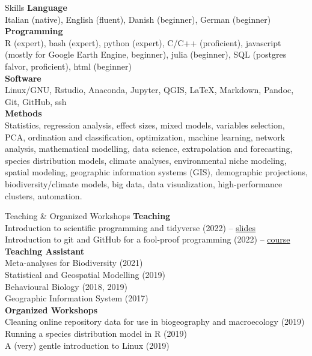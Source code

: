 \documentclass{resume} %
\begin{document}
\begin{rSection}{Skills}
{\bf Language}\\
Italian (native), English (fluent), Danish (beginner), German (beginner)\\
{\bf Programming}\\
R (expert), bash (expert), python (expert), C/C++ (proficient), javascript (mostly for Google Earth Engine, beginner), julia (beginner), SQL (postgres falvor, proficient), html (beginner)\\
{\bf Software} \\
Linux/GNU, Rstudio, Anaconda, Jupyter, QGIS, \LaTeX, Markdown, Pandoc, Git, GitHub, ssh\\
{\bf Methods} \\
Statistics, regression analysis, effect sizes, mixed models, variables selection, PCA, ordination and classification, optimization, machine learning, network analysis, mathematical modelling, data science, extrapolation and forecasting, species distribution models, climate analyses, environmental niche modeling, spatial modeling, geographic information systems (GIS), demographic projections, biodiversity/climate models, big data, data visualization, high-performance clusters, automation.
\end{rSection}

\begin{rSection}{Teaching \& Organized Workshops}
{\bf Teaching} \\
Introduction to scientific programming and tidyverse (2022) -- \href{https://emilio-berti.github.io/teaching/tidyverse.html#(1)}{slides}\\
Introduction to git and GitHub for a fool-proof programming (2022) -- \href{https://emilio-berti.github.io/idiv-git-introduction/}{course}\\
\clearpage
{\bf Teaching Assistant} \\
Meta-analyses for Biodiversity (2021)\\
Statistical and Geospatial Modelling (2019)\\
Behavioural Biology (2018, 2019)\\
Geographic Information System (2017)\\
{\bf Organized Workshops}\\
Cleaning online repository data for use in biogeography and macroecology (2019)\\
Running a species distribution model in R (2019)\\
A (very) gentle introduction to Linux (2019)
\end{rSection}
\end{document}
